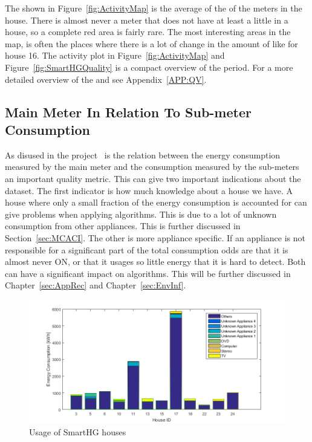 The  shown in Figure~\ref{fig:ActivityMap} is the average of the  of the meters in the house. There is almost never a meter that does not have at least a little  in a house, so a complete red area is fairly rare. The most interesting areas in the  map, is often the places where there is a lot of change in the amount of  like for house 16. The activity plot in Figure~\ref{fig:ActivityMap} and Figure~\ref{fig:SmartHGQuality} is a compact overview of the period. For a more detailed overview of the  and  see Appendix~\ref{APP:QV}. 

\subsection{Main Meter In Relation To Sub-meter Consumption}
\label{sec:MMIRTSM}
As disused in the  project~\citep{RefWorks:21} is the relation between the energy consumption measured by the main meter and the consumption measured by the sub-meters an important quality metric. This can give two important indications about the dataset. The first indicator is how much knowledge about a house we have. A house where only a small fraction of the energy consumption is accounted for can give problems when applying  algorithms. This is due to a lot of unknown consumption from other appliances. This is further discussed in Section~\ref{sec:MCACI}. The other is more appliance specific. If an appliance is not responsible for a significant part of the total consumption odds are that it is almost never ON, or that it usages so little energy that it is hard to detect. Both can have a significant impact on  algorithms. This will be further discussed in Chapter~\ref{sec:AppRec} and Chapter~\ref{sec:EnvInf}.  

\begin{figure}[H]
\centering
\includegraphics[width=1\textwidth]{billeder/SHGHouseUsagesV2.png}
\caption{Usage of SmartHG houses}
\label{fig:USAGEofSHG}
\end{figure}

